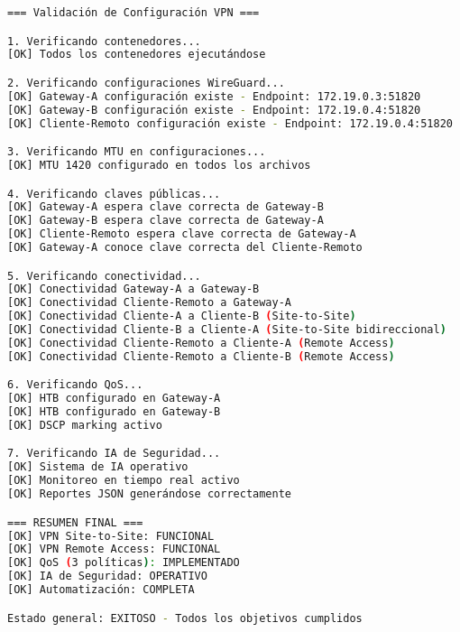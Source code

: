 \begin{lstlisting}[language=bash, caption=Resultado de validate\_configuration.sh]
=== Validación de Configuración VPN ===

1. Verificando contenedores...
[OK] Todos los contenedores ejecutándose

2. Verificando configuraciones WireGuard...
[OK] Gateway-A configuración existe - Endpoint: 172.19.0.3:51820
[OK] Gateway-B configuración existe - Endpoint: 172.19.0.4:51820
[OK] Cliente-Remoto configuración existe - Endpoint: 172.19.0.4:51820

3. Verificando MTU en configuraciones...
[OK] MTU 1420 configurado en todos los archivos

4. Verificando claves públicas...
[OK] Gateway-A espera clave correcta de Gateway-B
[OK] Gateway-B espera clave correcta de Gateway-A
[OK] Cliente-Remoto espera clave correcta de Gateway-A
[OK] Gateway-A conoce clave correcta del Cliente-Remoto

5. Verificando conectividad...
[OK] Conectividad Gateway-A a Gateway-B
[OK] Conectividad Cliente-Remoto a Gateway-A
[OK] Conectividad Cliente-A a Cliente-B (Site-to-Site)
[OK] Conectividad Cliente-B a Cliente-A (Site-to-Site bidireccional)
[OK] Conectividad Cliente-Remoto a Cliente-A (Remote Access)
[OK] Conectividad Cliente-Remoto a Cliente-B (Remote Access)

6. Verificando QoS...
[OK] HTB configurado en Gateway-A
[OK] HTB configurado en Gateway-B
[OK] DSCP marking activo

7. Verificando IA de Seguridad...
[OK] Sistema de IA operativo
[OK] Monitoreo en tiempo real activo
[OK] Reportes JSON generándose correctamente

=== RESUMEN FINAL ===
[OK] VPN Site-to-Site: FUNCIONAL
[OK] VPN Remote Access: FUNCIONAL  
[OK] QoS (3 políticas): IMPLEMENTADO
[OK] IA de Seguridad: OPERATIVO
[OK] Automatización: COMPLETA

Estado general: EXITOSO - Todos los objetivos cumplidos
\end{lstlisting}
